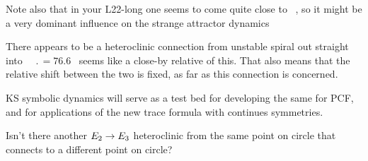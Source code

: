 \bigskip

Note also that in your L22-long one seems
to come quite close to ~\eqv, so it might be a very dominant
influence on the strange attractor dynamics


There appears to be a heteroclinic connection from 
{\eqv}
unstable spiral out straight into ~{\eqv}
$\period{} = 76.6$ \rpo\ seems like a close-by
relative of this.
That also means that the relative shift between the two {\eqva} is
fixed, as far as this connection is concerned.

KS symbolic dynamics will
serve as a test bed for developing the
same for PCF, and for applications of the new
trace formula with continues symmetries.

%
Isn't there another $ E_{2} \to E_{3} $ heteroclinic
from the same point on   circle that connects to a different point on
 circle?


\bigskip


